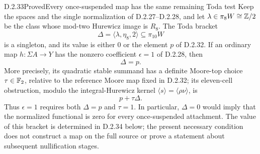 \begin{claim}{D.2.33}{Proved}{Every once-suspended map has the same remaining Toda test}
Keep the spaces and the single normalization of
\textup{D.2.27--D.2.28}, and let
$\lambda\in\pi_8W\cong\mathbb Z/2$ be the class whose mod-two
Hurewicz image is $R_8$. The Toda bracket
\[
 \Delta=\langle\lambda,\eta_8,2\rangle
       \subseteq\pi_{10}W
 \tag{D.2.33a}
\]
is a singleton, and its value is either $0$ or the element
$p$ of \textup{D.2.32}. If an ordinary map
$h:\Sigma A\to Y$ has the nonzero coefficient
$\epsilon=1$ of \textup{D.2.28}, then
\[
                         \Delta=p.
 \tag{D.2.33b}
\]
More precisely, its quadratic stable summand has a definite
Moore-top choice $\tau\in\mathbb F_2$, relative to the reference
Moore map fixed in \textup{D.2.32}; its eleven-cell
obstruction, modulo the integral-Hurewicz kernel
$\langle s\rangle=\langle\rho\nu\rangle$, is
\[
                    p+\tau\Delta.
 \tag{D.2.33c}
\]
Thus $\epsilon=1$ requires both $\Delta=p$ and $\tau=1$.
In particular, $\Delta=0$ would imply that the normalized
functional is zero for every once-suspended attachment.
The value of this bracket is determined in \textup{D.2.34} below;
the present necessary condition does not construct a map on the full
source or prove a statement about subsequent nullification stages.
\end{claim}
